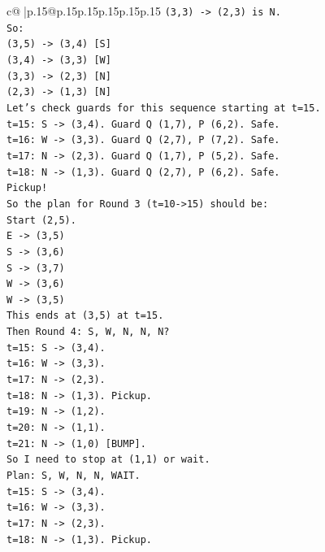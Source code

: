 \documentclass{article}
\begin{document}
{\begin{supertabular}{c@{$\;$}|p{.15\linewidth}@{}p{.15\linewidth}p{.15\linewidth}p{.15\linewidth}p{.15\linewidth}p{.15\linewidth}}
{{{\texttt{(3,3) {-}> (2,3) is N.} \\
\texttt{So:} \\
\texttt{(3,5) {-}> (3,4) {[}S{]}} \\
\texttt{(3,4) {-}> (3,3) {[}W{]}} \\
\texttt{(3,3) {-}> (2,3) {[}N{]}} \\
\texttt{(2,3) {-}> (1,3) {[}N{]}} \\
\texttt{Let's check guards for this sequence starting at t=15.} \\
\texttt{t=15: S {-}> (3,4). Guard Q (1,7), P (6,2). Safe.} \\
\texttt{t=16: W {-}> (3,3). Guard Q (2,7), P (7,2). Safe.} \\
\texttt{t=17: N {-}> (2,3). Guard Q (1,7), P (5,2). Safe.} \\
\texttt{t=18: N {-}> (1,3). Guard Q (2,7), P (6,2). Safe.} \\
\texttt{Pickup!} \\
\texttt{So the plan for Round 3 (t=10{-}>15) should be:} \\
\texttt{Start (2,5).} \\
\texttt{E {-}> (3,5)} \\
\texttt{S {-}> (3,6)} \\
\texttt{S {-}> (3,7)} \\
\texttt{W {-}> (3,6)} \\
\texttt{W {-}> (3,5)} \\
\texttt{This ends at (3,5) at t=15.} \\
\texttt{Then Round 4: S, W, N, N, N?} \\
\texttt{t=15: S {-}> (3,4).} \\
\texttt{t=16: W {-}> (3,3).} \\
\texttt{t=17: N {-}> (2,3).} \\
\texttt{t=18: N {-}> (1,3). Pickup.} \\
\texttt{t=19: N {-}> (1,2).} \\
\texttt{t=20: N {-}> (1,1).} \\
\texttt{t=21: N {-}> (1,0) {[}BUMP{]}.} \\
\texttt{So I need to stop at (1,1) or wait.} \\
\texttt{Plan: S, W, N, N, WAIT.} \\
\texttt{t=15: S {-}> (3,4).} \\
\texttt{t=16: W {-}> (3,3).} \\
\texttt{t=17: N {-}> (2,3).} \\
\texttt{t=18: N {-}> (1,3). Pickup.} \\
}}}
\end{supertabular}}
\end{document}
